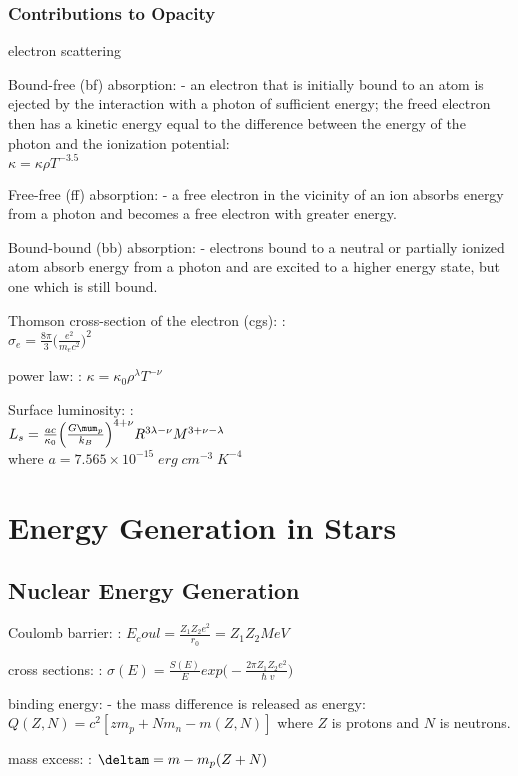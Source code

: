 \documentclass[a4paper, 11pt, landscape]{article}
\begin{document}
\begin{multicols*}{3}
\begin{compactenum}
\subsubsection{Contributions to Opacity}
	\item electron scattering
	\item [\color{red}Bound-free (bf) absorption:] - an electron that is initially bound to an atom is ejected by the interaction with a photon of sufficient energy; the freed electron then has a kinetic energy equal to the difference between the energy of the photon and the ionization potential: \\ $\kappa = \kappa \rho T^{-3.5}$
	\item [\color{red}Free-free (ff) absorption:] - a free electron in the vicinity of an ion absorbs energy from a photon and becomes a free electron with greater energy.
	\item [\color{red}Bound-bound (bb) absorption:] - electrons bound to a neutral or partially ionized atom absorb energy from a photon and are excited to a higher energy state, but one which is still bound.
	\item [\color{red}Thomson cross-section of the electron (cgs):]:\\
	$\sigma_{e} = \frac{8\pi}{3}\Big(\frac{e^{2}}{m_{e}c^{2}}\Big)^{2}$
	\item [\color{red}power law:]: $\kappa = \kappa_{0} \rho^{\lambda}T^{-\nu}$
	\item [\color{red}Surface luminosity:]: \\
	$L_{s} = \frac{ac}{\kappa_{0}} \Big(\frac{G\mum_{p}}{k_{B}}\Big)^{4+\nu}R^{3\lambda-\nu}M^{3+\nu-\lambda}$\\
	where $a = 7.565 \times 10^{-15} \; erg \; cm^{-3} \; K^{-4}$
\end{compactenum}

\section{Energy Generation in Stars}
\subsection{Nuclear Energy Generation}
\begin{compactenum}
	\item [\color{red}Coulomb barrier:]: $E_coul = \frac{Z_{1} Z_{2} e^{2}}{r_{0}} = Z_{1}Z_{2} MeV$
	\item [\color{red}cross sections:]: $\sigma(E) = \frac{S(E)}{E} exp \Big(-\frac{2\pi Z_{1} Z_{2} e^{2}}{\hslash v}\Big)$
	\item [\color{red}binding energy:] - the mass difference is released as energy: $Q(Z, N) = c^{2}[zm_{p} + N m_{n} - m(Z, N)]$ where $Z$ is protons and $N$ is neutrons.
	\item [\color{red}mass excess:]: $\deltam = m - m_{p}(Z + N)$
\end{compactenum}


\end{multicols*}
\end{document}

